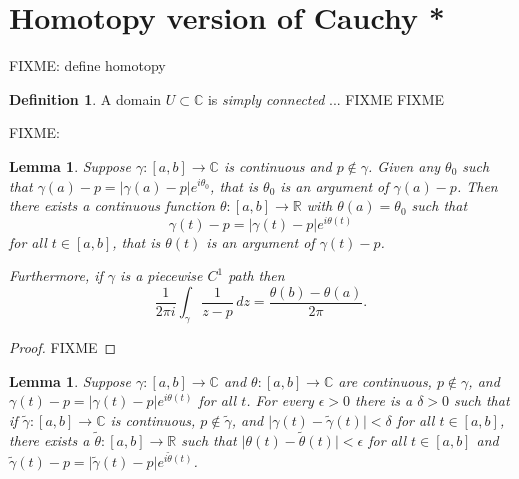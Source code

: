 \documentclass[12pt,openany]{book}
\newcommand{\sabs}[1]{\lvert {#1} \rvert}
\newcommand{\C}{{\mathbb{C}}}
\newcommand{\R}{{\mathbb{R}}}
\newcommand{\myindex}[1]{#1\index{#1}}
\theoremstyle{plain}
\newtheorem{lemma}[thm]{Lemma}
\theoremstyle{remark}
\theoremstyle{definition}
\newtheorem{defn}[thm]{Definition}
\theoremstyle{exercise}
\theoremstyle{example}
\begin{document}

\section{Homotopy version of Cauchy *}

FIXME: define homotopy

\begin{defn}
A domain $U \subset \C$ is \emph{\myindex{simply connected}}
... FIXME FIXME
%
\end{defn}

FIXME:

\begin{lemma}
Suppose $\gamma \colon [a,b] \to \C$ is continuous and $p \notin
\gamma$.  Given any $\theta_0$ such that
$\gamma(a)-p = \sabs{\gamma(a)-p} e^{i\theta_0}$, that is $\theta_0$ is
an argument of $\gamma(a)-p$.
Then there exists a continuous function
$\theta \colon [a,b] \to \R$ with $\theta(a) = \theta_0$ such that
\begin{equation*}
\gamma(t)-p = \sabs{\gamma(t)-p} e^{i\theta(t)}
\end{equation*}
for all $t \in [a,b]$, that is $\theta(t)$ is an argument of $\gamma(t)-p$.

Furthermore, if $\gamma$ is a piecewise $C^1$ path then
\begin{equation*}
\frac{1}{2\pi i} \int_\gamma \frac{1}{z-p} \, dz =
\frac{\theta(b)-\theta(a)}{2\pi} .
\end{equation*}
\end{lemma}

\begin{proof}
FIXME
\end{proof}

\begin{lemma}
Suppose $\gamma \colon [a,b] \to \C$ and $\theta \colon [a,b] \to \C$
are continuous, $p \notin \gamma$,
and $\gamma(t)-p = \sabs{\gamma(t)-p} e^{i\theta(t)}$ for all $t$.
For every $\epsilon > 0$ there is a $\delta > 0$ such that
if $\widetilde{\gamma} \colon [a,b] \to \C$ is continuous,
$p \notin \widetilde{\gamma}$, and
$\sabs{\gamma(t)-\widetilde{\gamma}(t)} < \delta$ for all $t \in [a,b]$,
there exists a $\widetilde{\theta} \colon [a,b] \to \R$ such that
$\sabs{\theta(t)-\widetilde{\theta}(t)} < \epsilon$ for all $t \in [a,b]$
and $\widetilde{\gamma}(t)-p = \sabs{\widetilde{\gamma}(t)-p}
e^{i\widetilde{\theta}(t)}$.
\end{lemma}
\end{document}
